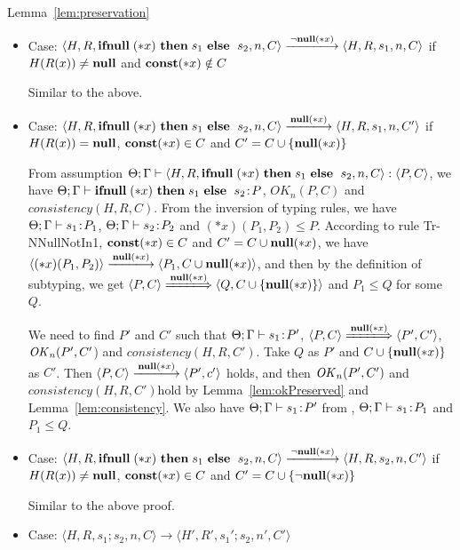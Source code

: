\begin{pfof}{Lemma~\ref{lem:preservation}}
\begin{itemize}
\item Case: \(\langle H, R, \IFNULL \Sirx \ \THEN s_{1} \ \ELSE
  \ s_{2}, n, C\rangle \xlongrightarrow{\snnull} \langle H, R, s_{1}, n, C \rangle\)
  if \(H(R(x)) \neq \mathbf{null}\) and \(\mathbf{const}(*x) \notin C\)

    Similar to the above.
  
\item Case: \(\langle H, R, \IFNULL \Sirx \ \THEN s_{1} \ \ELSE
  \ s_{2}, n, C\rangle \xlongrightarrow{\snull} \langle H, R, s_{1}, n, C'
  \rangle\) if \(H(R(x)) = \mathbf{null}\), \(\mathbf{const}(*x) \in C\) and \(C' = C
  \cup \{{\bf null}(*x)\}\)

  From assumption \( \Theta; \Gamma \vdash \langle H, R, \mathbf{ifnull}\;(*x)
  \ \mathbf{then}\; s_{1} \ \mathbf{else}\; \ s_{2}, n, C \rangle : \langle P, C
  \rangle\), we have \(\Theta; \Gamma \vdash \mathbf{ifnull}\;(*x) \ \mathbf{then}\;
  s_{1} \ \mathbf{else}\; \ s_{2} \!:\! P \), \(OK_n(P, C)\) and \(consistency(H,
  R, C)\). From the inversion of typing rules, we have \(\Theta;
  \Gamma \vdash s_{1} \!:\! P_1\), \(\Theta; \Gamma \vdash s_{2} \!:\!
  P_2\) and \((*x)(P_1, P_2) \le P\). According to rule Tr-NNullNotIn1, \(\mathbf{const}(*x) \in C\) and \(C' = C \cup {\bf null}(*x)\), we have \(\langle
  (*x)(P_1, P_2) \rangle \xlongrightarrow{\snull} \langle P_1,
  C \cup \snull \rangle \), and then by the definition of subtyping, we get \(\langle P, C \rangle \xLongrightarrow{\snull}
  \langle Q, C\cup \{\snull\} \rangle \) and \(P_1 \le Q\) for some
  \(Q\).
  
  We need to find \(P'\) and \(C'\) such that \(\Theta;\Gamma \vdash
  s_1 \!:\! P'\), \( \langle P, C \rangle \xLongrightarrow{\snull}
  \langle P', C' \rangle\), \(\mathit{OK}_n(P', C'\)) and \(consistency(H, R,
  C')\). Take \(Q\) as \(P'\) and \(C\cup \{{\bf null}(*x)\}\) as \(C'\). Then
  \( \langle P,C \rangle \xlongrightarrow{\snull} \langle P', c'
  \rangle\) holds, and then \(\mathit{OK}_n(P', C')\) and \(consistency(H, R,
  C')\)hold by Lemma~\ref{lem:okPreserved} and
  Lemma~\ref{lem:consistency}.  We also have \(\Theta; \Gamma \vdash
  s_1 \!:\! P'\) from , \(\Theta; \Gamma \vdash s_1 \!:\!
  P_1\) and \( P_1 \le Q\).

\item Case: \(\langle H, R, \IFNULL \Sirx \ \THEN s_{1} \ \ELSE
    \ s_{2}, n, C\rangle \xlongrightarrow{\snnull} \langle H, R, s_{2}, n, C'
    \rangle\) if \(H(R(x)) \neq \mathbf{null}\), \(\mathbf{const}(*x) \in C\) and \(C'
    = C \cup \{\neg{\bf null}(*x)\}\)

  Similar to the above proof.

\item Case: \(\langle H, R, s_1;s_2, n, C\rangle \rightarrow \langle
  H', R', s_1';s_2, n', C' \rangle \)


\end{itemize}
\end{pfof}

